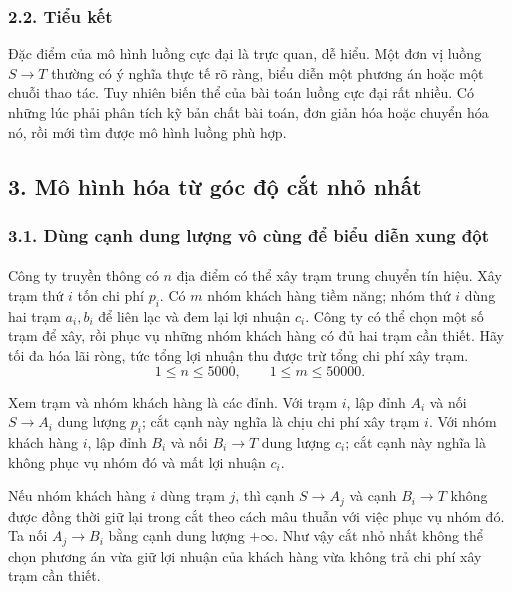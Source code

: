 \documentclass[11pt]{article}
\begin{document}
\subsubsection*{2.2. Tiểu kết}

Đặc điểm của mô hình luồng cực đại là trực quan, dễ hiểu. Một đơn vị luồng
\(S\to T\) thường có ý nghĩa thực tế rõ ràng, biểu diễn một phương án hoặc một
chuỗi thao tác. Tuy nhiên biến thể của bài toán luồng cực đại rất nhiều. Có
những lúc phải phân tích kỹ bản chất bài toán, đơn giản hóa hoặc chuyển hóa
nó, rồi mới tìm được mô hình luồng phù hợp.

\subsection*{3. Mô hình hóa từ góc độ cắt nhỏ nhất}

\subsubsection*{3.1. Dùng cạnh dung lượng vô cùng để biểu diễn xung đột}

\paragraph{}
Công ty truyền thông có \(n\) địa điểm có thể xây trạm trung chuyển tín hiệu.
Xây trạm thứ \(i\) tốn chi phí \(p_i\). Có \(m\) nhóm khách hàng tiềm năng;
nhóm thứ \(i\) dùng hai trạm \(a_i,b_i\) để liên lạc và đem lại lợi nhuận
\(c_i\). Công ty có thể chọn một số trạm để xây, rồi phục vụ những nhóm khách
hàng có đủ hai trạm cần thiết. Hãy tối đa hóa lãi ròng, tức tổng lợi nhuận
thu được trừ tổng chi phí xây trạm.
\[
  1\le n\le 5000,\qquad 1\le m\le 50000.
\]

Xem trạm và nhóm khách hàng là các đỉnh. Với trạm \(i\), lập đỉnh \(A_i\) và
nối \(S\to A_i\) dung lượng \(p_i\); cắt cạnh này nghĩa là chịu chi phí xây
trạm \(i\). Với nhóm khách hàng \(i\), lập đỉnh \(B_i\) và nối \(B_i\to T\)
dung lượng \(c_i\); cắt cạnh này nghĩa là không phục vụ nhóm đó và mất lợi
nhuận \(c_i\).

Nếu nhóm khách hàng \(i\) dùng trạm \(j\), thì cạnh \(S\to A_j\) và cạnh
\(B_i\to T\) không được đồng thời giữ lại trong cắt theo cách mâu thuẫn với
việc phục vụ nhóm đó. Ta nối \(A_j\to B_i\) bằng cạnh dung lượng \(+\infty\).
Như vậy cắt nhỏ nhất không thể chọn phương án vừa giữ lợi nhuận của khách
hàng vừa không trả chi phí xây trạm cần thiết.
\end{document}
